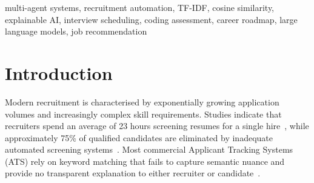 \documentclass[conference]{IEEEtran}
\begin{document}
\begin{abstract}
The recruitment industry faces significant challenges in efficiently matching candidates with job opportunities due to high application volumes, subjective evaluation criteria, and fragmented tooling. This paper presents an AI-Powered Agentic Hiring Platform that integrates a multi-agent architecture, hybrid AI/NLP-based candidate shortlisting, automated interview scheduling, and a suite of candidate development tools. The system's novel contributions include: (1)~a hybrid shortlisting agent combining TF-IDF cosine similarity with Google Gemini~AI for explainable match scoring; (2)~a break-aware round-robin scheduling algorithm with Fisher-Yates randomisation guaranteeing $\Delta_{\text{load}}\!\leq\!1$; (3)~a remote coding assessment module backed by the Piston API; (4)~a Gemini-powered resume optimiser with hallucination guard and PDF export; (5)~a career roadmap generator using Groq Llama~3.3-70B; (6)~a profile-driven job recommender aggregating from Adzuna and Jooble; and (7)~a zero-cost FAQ chatbot using Qdrant vector search with no LLM inference at query time. Implemented with Node.js~18, React~18, and PostgreSQL~14, the platform delivers a production-ready recruitment ecosystem bridging the gap between candidate preparation and employer evaluation.
\end{abstract}

\begin{IEEEkeywords}
multi-agent systems, recruitment automation, TF-IDF, cosine similarity, explainable AI, interview scheduling, coding assessment, career roadmap, large language models, job recommendation
\end{IEEEkeywords}

\section{Introduction}

Modern recruitment is characterised by exponentially growing application volumes and increasingly complex skill requirements. Studies indicate that recruiters spend an average of 23 hours screening resumes for a single hire~\cite{b1}, while approximately 75\% of qualified candidates are eliminated by inadequate automated screening systems~\cite{b2}. Most commercial Applicant Tracking Systems (ATS) rely on keyword matching that fails to capture semantic nuance and provide no transparent explanation to either recruiter or candidate~\cite{b3}.
\end{document}
